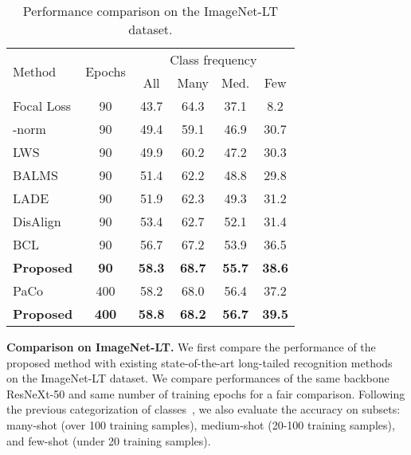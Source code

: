 \documentclass{article}
\theoremstyle{plain}
\theoremstyle{definition}
\theoremstyle{remark}
\begin{document}
\begin{table}[t]
\centering
\caption{Performance comparison on the ImageNet-LT dataset.}
\begin{adjustbox}{center}
\begin{tabular}{l|c|cccc}
\hline
\multirow{2}{*}{Method}               & \multirow{2}{*}{Epochs} & \multicolumn{4}{c}{Class frequency}                                                \\ \cline{3-6} 
                                      &                         & \multicolumn{1}{c|}{All}           & Many          & Med.          & Few           \\ \hline
Focal Loss        & 90                      & \multicolumn{1}{c|}{43.7}          & 64.3          & 37.1          & 8.2           \\
-norm & 90                      & \multicolumn{1}{c|}{49.4}          & 59.1          & 46.9          & 30.7          \\
LWS         & 90                      & \multicolumn{1}{c|}{49.9}          & 60.2          & 47.2          & 30.3          \\
BALMS          & 90                      & \multicolumn{1}{c|}{51.4}          & 62.2          & 48.8          & 29.8          \\
LADE     & 90                      & \multicolumn{1}{c|}{51.9}          & 62.3          & 49.3          & 31.2          \\
DisAlign & 90                      & \multicolumn{1}{c|}{53.4}          & 62.7          & 52.1          & 31.4          \\
BCL            & 90                      & \multicolumn{1}{c|}{56.7}          & 67.2          & 53.9          & 36.5          \\
\textbf{Proposed}                     & \textbf{90}             & \multicolumn{1}{c|}{\textbf{58.3}} & \textbf{68.7} & \textbf{55.7} & \textbf{38.6} \\ \hline
PaCo         & 400                     & \multicolumn{1}{c|}{58.2}          & 68.0          & 56.4          & 37.2          \\
\textbf{Proposed}                     & \textbf{400}            & \multicolumn{1}{c|}{\textbf{58.8}} & \textbf{68.2} & \textbf{56.7} & \textbf{39.5} \\ \hline
\end{tabular}

%
 \end{adjustbox}
\label{tab:imagenetlt}
\end{table}
\textbf{Comparison on ImageNet-LT.} We first compare the performance of the proposed method with existing state-of-the-art long-tailed recognition methods on the ImageNet-LT dataset. We compare performances of the same backbone ResNeXt-50 and same number of training epochs for a fair comparison. Following the previous categorization of classes~\cite{liu2019large}, we also evaluate the accuracy on subsets: many-shot (over 100 training samples), medium-shot (20-100 training samples), and few-shot (under 20 training samples).
\end{document}
